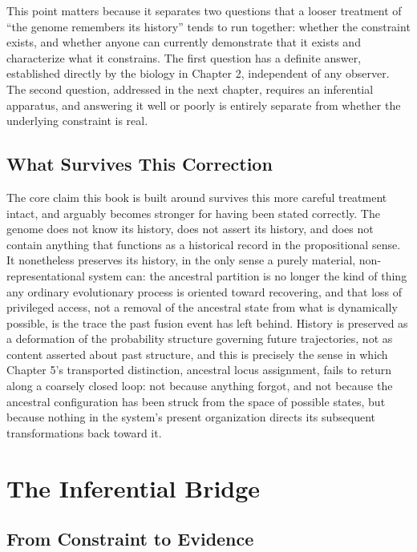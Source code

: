 \documentclass[11pt]{book}
\begin{document}
This point matters because it separates two questions that a looser treatment of ``the genome remembers its history'' tends to run together: whether the constraint exists, and whether anyone can currently demonstrate that it exists and characterize what it constrains. The first question has a definite answer, established directly by the biology in Chapter 2, independent of any observer. The second question, addressed in the next chapter, requires an inferential apparatus, and answering it well or poorly is entirely separate from whether the underlying constraint is real.

\section{What Survives This Correction}

The core claim this book is built around survives this more careful treatment intact, and arguably becomes stronger for having been stated correctly. The genome does not know its history, does not assert its history, and does not contain anything that functions as a historical record in the propositional sense. It nonetheless preserves its history, in the only sense a purely material, non-representational system can: the ancestral partition is no longer the kind of thing any ordinary evolutionary process is oriented toward recovering, and that loss of privileged access, not a removal of the ancestral state from what is dynamically possible, is the trace the past fusion event has left behind. History is preserved as a deformation of the probability structure governing future trajectories, not as content asserted about past structure, and this is precisely the sense in which Chapter 5's transported distinction, ancestral locus assignment, fails to return along a coarsely closed loop: not because anything forgot, and not because the ancestral configuration has been struck from the space of possible states, but because nothing in the system's present organization directs its subsequent transformations back toward it.

\chapter{The Inferential Bridge}

\section{From Constraint to Evidence}
\end{document}
